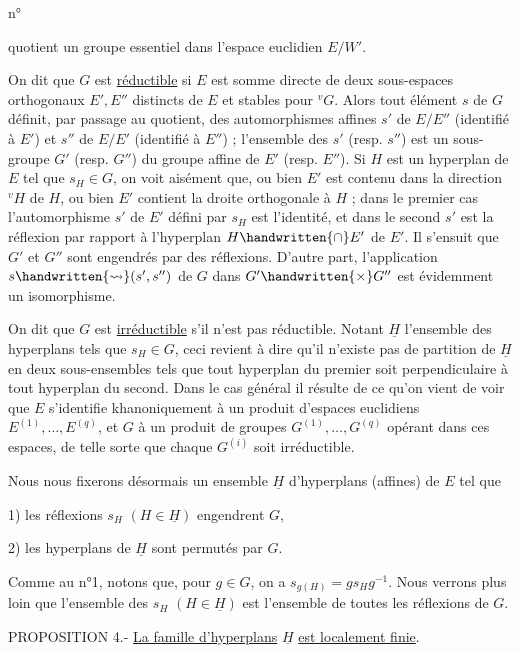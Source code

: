 \begin{flushright}n° \end{flushright}
quotient un groupe essentiel dans l'espace euclidien $E/W'$.

On dit que $G$ est \uline{réductible} si $E$ est somme directe de deux sous-espaces orthogonaux $E',E''$ distincts de $E$ et stables pour ${}^vG$. Alors tout élément $s$ de $G$ définit, par passage au quotient, des automorphismes affines $s'$ de $E/E''$ (identifié à $E'$) et $s''$ de $E/E'$ (identifié à $E''$) ; l'ensemble des $s'$ (resp. $s''$) est un sous-groupe $G'$ (resp. $G''$) du groupe affine de $E'$ (resp. $E''$). Si $H$ est un hyperplan de $E$ tel que $s_H\in G$, on voit aisément que, ou bien $E'$ est contenu dans la direction ${}^vH$ de $H$, ou bien $E'$ contient la droite orthogonale à $H$ ; dans le premier cas l'automorphisme $s'$ de $E'$ défini par $s_H$ est l'identité, et dans le second $s'$ est la réflexion par rapport à l'hyperplan $H\handwritten{\cap}E'$ de $E'$. Il s'ensuit que $G'$ et $G''$ sont engendrés par des réflexions. D'autre part, l'application $s\handwritten{\rightsquigarrow}(s',s'')$ de $G$ dans $G'\handwritten{\times}G''$ est évidemment un isomorphisme.

On dit que $G$ est \uline{irréductible} s'il n'est pas réductible. Notant $\underline{H}$ l'ensemble des hyperplans tels que $s_H\in G$, ceci revient à dire qu'il n'existe pas de partition de $\underline{H}$ en deux sous-ensembles tels que tout hyperplan du premier soit perpendiculaire à tout hyperplan du second. Dans le cas général il résulte de ce qu'on vient de voir que $E$ s'identifie khanoniquement à un produit d'espaces euclidiens $E^{(1)},\ldots,E^{(q)}$, et $G$ à un produit de groupes $G^{(1)},\ldots,G^{(q)}$ opérant dans ces espaces, de telle sorte que chaque $G^{(i)}$ soit irréductible.

Nous nous fixerons désormais un ensemble $\underline{H}$ d'hyperplans (affines) de $E$ tel que

1) les réflexions $s_H$ $(H\in\underline{H})$ engendrent $G$,

2) les hyperplans de $\underline{H}$ sont permutés par $G$.

Comme au n°1, notons que, pour $g\in G$, on a $s_{g(H)}=gs_Hg^{-1}$. Nous verrons plus loin que l'ensemble des $s_H$ $(H\in\underline{H})$ est l'ensemble de toutes les réflexions de $G$.

PROPOSITION 4.- \uline{La famille d'hyperplans} $\underline{H}$ \uline{est localement finie}.

